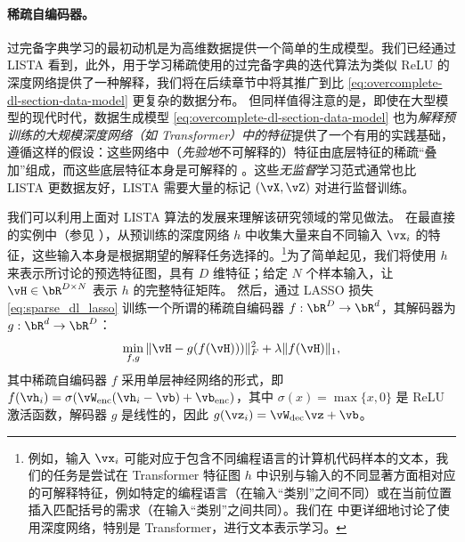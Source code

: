 \documentclass[../../book-main.tex]{subfiles}
\begin{document}



\paragraph{稀疏自编码器。}
过完备字典学习的最初动机是为高维数据提供一个简单的生成模型。我们已经通过 LISTA 看到，此外，用于学习稀疏使用的过完备字典的迭代算法为类似 ReLU 的深度网络提供了一种解释，我们将在后续章节中将其推广到比 \eqref{eq:overcomplete-dl-section-data-model} 更复杂的数据分布。
但同样值得注意的是，即使在大型模型的现代时代，数据生成模型 \eqref{eq:overcomplete-dl-section-data-model} 也为\textit{解释预训练的大规模深度网络（如 Transformer）中的特征}提供了一个有用的实践基础，遵循这样的假设：这些网络中（\textit{先验地}不可解释的）特征由底层特征的稀疏“叠加”组成，而这些底层特征本身是可解释的 \cite{elhage2022superposition}。这些\textit{无监督}学习范式通常也比 LISTA 更数据友好，LISTA 需要大量的标记 $(\vX, \vZ)$ 对进行监督训练。

我们可以利用上面对 LISTA 算法的发展来理解该研究领域的常见做法。
在最直接的实例中（参见 \citep{huben2024sparse, gao2025scaling}），从预训练的深度网络 $h$ 中收集大量来自不同输入 $\vx_i$ 的特征，这些输入本身是根据期望的解释任务选择的。\footnote{例如，输入 $\vx_i$ 可能对应于包含不同编程语言的计算机代码样本的文本，我们的任务是尝试在 Transformer 特征图 $h$ 中识别与输入的不同显著方面相对应的可解释特征，例如特定的编程语言（在输入“类别”之间不同）或在当前位置插入匹配括号的需求（在输入“类别”之间共同）。我们在  中更详细地讨论了使用深度网络，特别是 Transformer，进行文本表示学习。}为了简单起见，我们将使用 $h$ 来表示所讨论的预选特征图，具有 $D$ 维特征；给定 $N$ 个样本输入，让 $\vH \in \bR^{D \times N}$ 表示 $h$ 的完整特征矩阵。
然后，通过 LASSO 损失 \eqref{eq:sparse_dl_lasso} 训练一个所谓的稀疏自编码器 $f : \bR^D \to \bR^d$，其解码器为 $g : \bR^d \to \bR^D$：
\begin{equation}\label{eq:sae-loss}
  \min_{f, g} \| \vH - g(f(\vH))) \|_F^2 + \lambda \|f(\vH)\|_1 ,
\end{equation}
其中稀疏自编码器 $f$ 采用单层神经网络的形式，即 $f(\vh_i) = \sigma(\vW_{\mathrm{enc}}(\vh_i - \vb) + \vb_{\mathrm{enc}})$，其中 $\sigma(x) = \max \{x, 0\}$ 是 ReLU 激活函数，解码器 $g$ 是线性的，因此 $g(\vz_i) = \vW_{\mathrm{dec}}\vz + \vb$。
\end{document}
